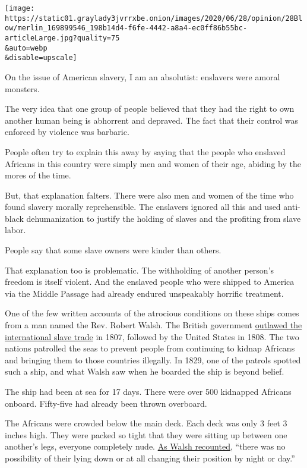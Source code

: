 \texttt{[image: https://static01.graylady3jvrrxbe.onion/images/2020/06/28/opinion/28Blow/merlin\_169899546\_198b14d4-f6fe-4442-a8a4-ec0ff86b55bc-articleLarge.jpg?quality=75\\\&auto=webp\\\&disable=upscale]}

On the issue of American slavery, I am an absolutist: enslavers were
amoral monsters.

The very idea that one group of people believed that they had the right
to own another human being is abhorrent and depraved. The fact that
their control was enforced by violence was barbaric.

People often try to explain this away by saying that the people who
enslaved Africans in this country were simply men and women of their
age, abiding by the mores of the time.

But, that explanation falters. There were also men and women of the time
who found slavery morally reprehensible. The enslavers ignored all this
and used anti-black dehumanization to justify the holding of slaves and
the profiting from slave labor.

People say that some slave owners were kinder than others.

That explanation too is problematic. The withholding of another person's
freedom is itself violent. And the enslaved people who were shipped to
America via the Middle Passage had already endured unspeakably horrific
treatment.

One of the few written accounts of the atrocious conditions on these
ships comes from a man named the Rev. Robert Walsh. The British
government
\href{https://www.thirteen.org/wnet/historyofus/web05/features/source/C04.html}{outlawed
the international slave trade} in 1807, followed by the United States in
1808. The two nations patrolled the seas to prevent people from
continuing to kidnap Africans and bringing them to those countries
illegally. In 1829, one of the patrols spotted such a ship, and what
Walsh saw when he boarded the ship is beyond belief.

The ship had been at sea for 17 days. There were over 500 kidnapped
Africans onboard. Fifty-five had already been thrown overboard.

The Africans were crowded below the main deck. Each deck was only 3 feet
3 inches high. They were packed so tight that they were sitting up
between one another's legs, everyone completely nude.
\href{https://www.thirteen.org/wnet/historyofus/web05/features/source/docs/C04.pdf}{As
Walsh recounted}, ``there was no possibility of their lying down or at
all changing their position by night or day.''

